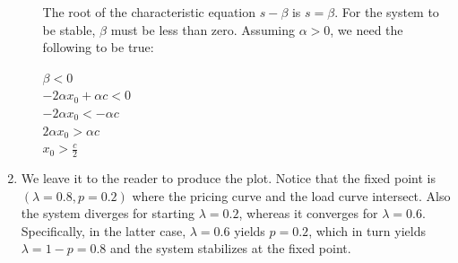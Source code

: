 \documentclass{article}
\begin{document}
\begin{enumerate}
\begin{itemize}
\noindent The root of the characteristic equation $s - \beta$ is
$s = \beta$. For the system to be stable, $\beta$ must be less
than zero. Assuming $\alpha > 0$, we need the following to be
true: \bigbreak

\noindent $\beta < 0$\\
\noindent $-2 \alpha x_0 + \alpha c < 0$\\
\noindent $-2 \alpha x_0 < -\alpha c$\\
\noindent $2 \alpha x_0 > \alpha c$\\
\noindent $x_0 > {\frac{c}{2}}$ \bigbreak


\end{itemize}


\item We leave it to the reader to produce the plot. Notice that the fixed point is $(\lambda=0.8, p=0.2)$  where the pricing curve and the load curve intersect. Also the system diverges for starting $\lambda=0.2$, whereas it converges for $\lambda=0.6.$ Specifically, in the latter case, $\lambda=0.6$ yields $p=0.2$, which in turn yields $\lambda=1-p=0.8$ and the system stabilizes at the fixed point.



\end{enumerate}



%
\end{document}
